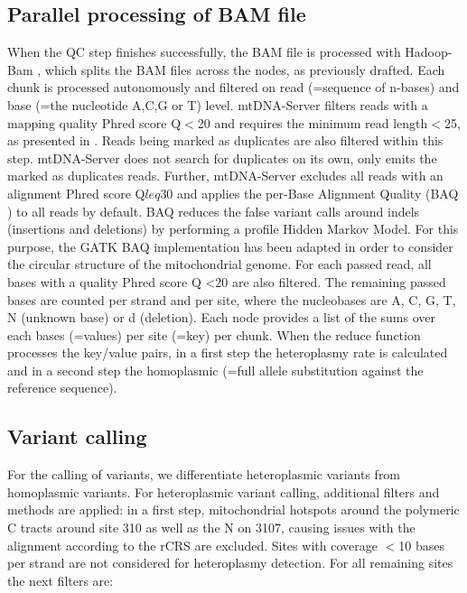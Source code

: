 \subsection{Parallel processing of BAM file}\label{settings}
When the QC step finishes successfully, the BAM file is processed with Hadoop-Bam \cite{Niemenmaa2012}, which splits the BAM files across the nodes, as previously drafted. Each chunk is processed autonomously and filtered on read (=sequence of n-bases) and base (=the nucleotide A,C,G or T) level. mtDNA-Server filters reads with a mapping quality Phred score Q$<$20  and requires the minimum read length$<$25, as presented in \cite{Zhidkov2011}. Reads being marked as duplicates are also filtered within this step. mtDNA-Server does not search for duplicates on its own, only emits the marked as duplicates reads. Further, mtDNA-Server excludes all reads with an alignment Phred score Q$leq$30 and applies the per-Base Alignment Quality (BAQ \cite{Li2011}) to all reads by default. BAQ reduces the false variant calls around indels (insertions and deletions) by performing a profile Hidden Markov Model. For this purpose, the GATK \cite{McKenna2010} BAQ implementation has been adapted in order to consider the circular structure of the mitochondrial genome. For each passed read, all bases with a quality Phred score Q <20 are also filtered. The remaining passed bases are counted per strand and per site, where the nucleobases are A, C, G, T, N (unknown base) or d (deletion). Each node provides a list of the sums over each bases (=values) per site (=key) per chunk.
When the reduce function processes the key/value pairs, in a first step the heteroplasmy rate is calculated and in a second step the homoplasmic (=full allele substitution against the reference sequence).
\subsection{Variant calling}
For the calling of variants, we differentiate heteroplasmic variants from homoplasmic variants. For heteroplasmic variant calling, additional filters and methods are applied: in a first step, mitochondrial hotspots around the polymeric C tracts around site 310 as well as the N on 3107, causing issues with the alignment according to the rCRS are excluded. Sites with coverage $<$10 bases per strand are not considered for heteroplasmy detection. For all remaining sites the next filters are:

